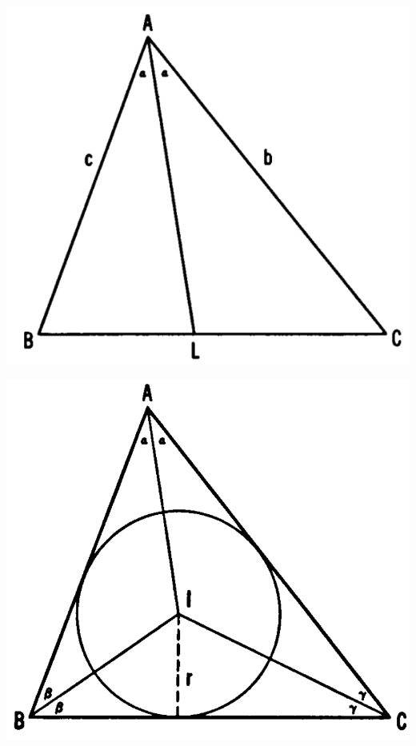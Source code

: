\documentclass[DIV=12, a4]{scrartcl}
\begin{document}
\begin{center}
  
      \begin{minipage}[b]{0.45\textwidth}
    \includegraphics[width=\textwidth]{media/1-3D}
  \end{minipage}
  \hfill
  \begin{minipage}[b]{0.45\textwidth}
    \includegraphics[width=\textwidth]{media/1-3E}
  \end{minipage}
\end{center}
\end{document}
